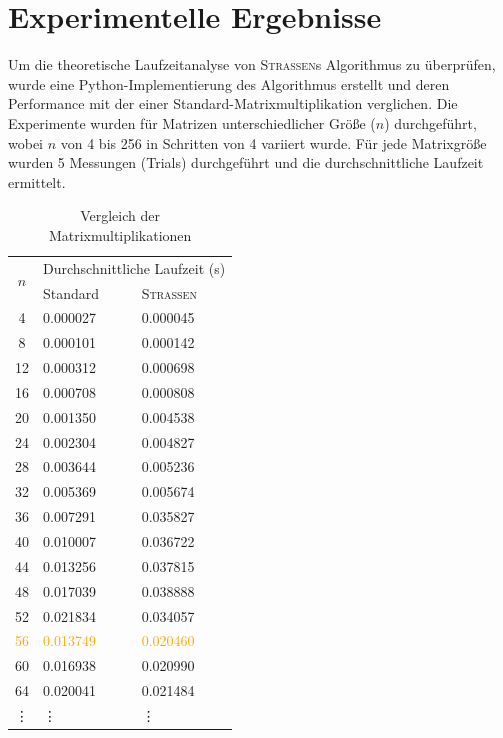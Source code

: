 \documentclass{scrartcl}
\begin{document}
\section{Experimentelle Ergebnisse}
Um die theoretische Laufzeitanalyse von \textsc{Strassen}s Algorithmus zu überprüfen, wurde eine Python-Implementierung des Algorithmus erstellt und deren Performance mit der einer Standard-Matrixmultiplikation verglichen. Die Experimente wurden für Matrizen unterschiedlicher Größe ($n$) durchgeführt, wobei $n$ von 4 bis 256 in Schritten von 4 variiert wurde. Für jede Matrixgröße wurden 5 Messungen (Trials) durchgeführt und die durchschnittliche Laufzeit ermittelt.
\begin{table}[h!]
	\centering
	\caption{Vergleich der Matrixmultiplikationen}
	\label{tab:strassen-results}
	\begin{tabular}{c|m{3.3cm}|m{3.3cm}}
		\hline
		\multirow{2}{*}{$n$} & \multicolumn{2}{c}{Durchschnittliche Laufzeit (s)} \\ %
		\cline{2-3} %
		& Standard & \textsc{Strassen} \\ %
		\hline
		\hline
		4 & 0.000027 & 0.000045 \\ 
		8 & 0.000101 & 0.000142 \\ 
		12 & 0.000312 & 0.000698 \\ 
		16 & 0.000708 & 0.000808 \\ 
		20 & 0.001350 & 0.004538 \\  
		24 & 0.002304 & 0.004827 \\ 
		28 & 0.003644 & 0.005236 \\ 
		32 & 0.005369 & 0.005674 \\ 
		36 & 0.007291 & 0.035827 \\ 
		40 & 0.010007 & 0.036722 \\ 
		44 & 0.013256 & 0.037815 \\ 
		48 & 0.017039 & 0.038888 \\ 
		52 & 0.021834 & 0.034057 \\ 
		\textcolor{orange}{56} & \textcolor{orange}{0.013749} & \textcolor{orange}{0.020460} \\ 
		60 & 0.016938 & 0.020990 \\ 
		64 & 0.020041 & 0.021484 \\ 
		\vdots & \vdots & \vdots \\ 

\end{tabular}
\end{table}
\end{document}
